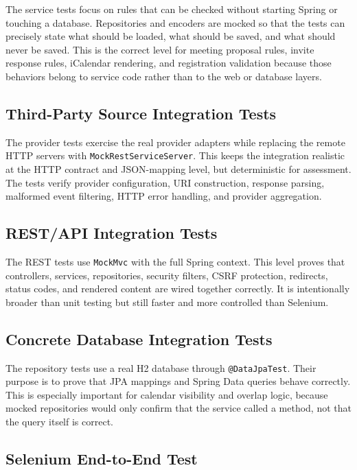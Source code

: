 The service tests focus on rules that can be checked without starting Spring or touching a database. Repositories and encoders are mocked so that the tests can precisely state what should be loaded, what should be saved, and what should never be saved. This is the correct level for meeting proposal rules, invite response rules, iCalendar rendering, and registration validation because those behaviors belong to service code rather than to the web or database layers.

\subsection{Third-Party Source Integration Tests}

The provider tests exercise the real provider adapters while replacing the remote HTTP servers with \texttt{MockRestServiceServer}. This keeps the integration realistic at the HTTP contract and JSON-mapping level, but deterministic for assessment. The tests verify provider configuration, URI construction, response parsing, malformed event filtering, HTTP error handling, and provider aggregation.

\subsection{REST/API Integration Tests}

The REST tests use \texttt{MockMvc} with the full Spring context. This level proves that controllers, services, repositories, security filters, CSRF protection, redirects, status codes, and rendered content are wired together correctly. It is intentionally broader than unit testing but still faster and more controlled than Selenium.

\subsection{Concrete Database Integration Tests}

The repository tests use a real H2 database through \texttt{@DataJpaTest}. Their purpose is to prove that JPA mappings and Spring Data queries behave correctly. This is especially important for calendar visibility and overlap logic, because mocked repositories would only confirm that the service called a method, not that the query itself is correct.

\subsection{Selenium End-to-End Test}

